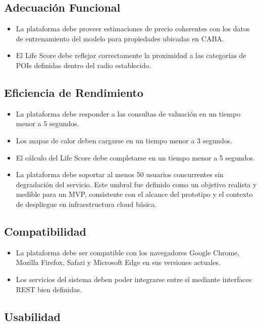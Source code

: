 \subsection{Adecuación Funcional}

\begin{itemize}
\item La plataforma debe proveer estimaciones de precio coherentes con los datos de entrenamiento del modelo para propiedades ubicadas en CABA.
\item El Life Score debe reflejar correctamente la proximidad a las categorías de POIs definidas dentro del radio establecido.
\end{itemize}

\subsection{Eficiencia de Rendimiento}

\begin{itemize}
\item La plataforma debe responder a las consultas de valuación en un tiempo menor a 5 segundos.
\item Los mapas de calor deben cargarse en un tiempo menor a 3 segundos.
\item El cálculo del Life Score debe completarse en un tiempo menor a 5 segundos.
\item La plataforma debe soportar al menos 50 usuarios concurrentes sin degradación del servicio. Este umbral fue definido como un objetivo realista y medible para un MVP, consistente con el alcance del prototipo y el contexto de despliegue en infraestructura cloud básica.
\end{itemize}

\subsection{Compatibilidad}

\begin{itemize}
\item La plataforma debe ser compatible con los navegadores Google Chrome, Mozilla Firefox, Safari y Microsoft Edge en sus versiones actuales.
\item Los servicios del sistema deben poder integrarse entre sí mediante interfaces REST bien definidas.
\end{itemize}

\subsection{Usabilidad}

